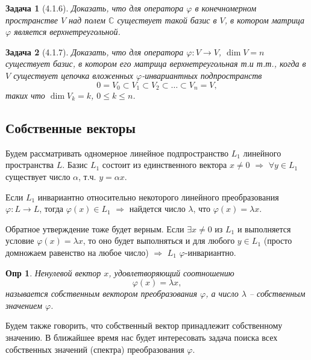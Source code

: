 \documentclass[a4paper,12pt]{article}
\newtheorem*{definition}{Опр}
\newtheorem*{prob}{Задача}
\begin{document}
\begin{prob}[4.1.6]
	Доказать, что для оператора $\varphi$ в конечномерном пространстве $V$ над полем $\mathbb{C}$ существует такой базис в $V$, в котором матрица $\varphi$ является верхнетреугольной.
\end{prob}

\begin{prob}[4.1.7]
	Доказать, что для оператора $\varphi: V \to V$, $\dim V = n$ существует базис, в котором его матрица верхнетреугольная т.и т.т., когда в $V$ существует цепочка вложенных $\varphi$-инвариантных подпространств
	\[
		0 = V_0 \subset V_1 \subset V_2 \subset \ldots \subset V_n = V,
	\]
	таких что $\dim V_k = k$, $0 \le k \le n$.
\end{prob}

\subsection{Собственные векторы}

Будем рассматривать одномерное линейное подпространство $L_1$ линейного пространства $L$. Базис $L_1$ состоит из единственного вектора $x \ne 0$ $\Rightarrow$ $\forall y \in L_1$ существует число $\alpha$, т.ч. $y = \alpha x$.

Если $L_1$ инвариантно относительно некоторого линейного преобразования $\varphi: L \to L$, тогда $\varphi(x) \in L_1$ $\Rightarrow$ найдется число $\lambda$, что $\varphi(x) = \lambda x$.
	
Обратное утверждение тоже будет верным. Если $\exists x \ne 0$ из $L_1$ и выполняется условие $\varphi(x) = \lambda x$, то оно будет выполняться и для любого $y \in L_1$ (просто домножаем равенство на любое число) $\Rightarrow$ $L_1$ $\varphi$-инвариантно.

\begin{definition}
	Ненулевой вектор $x$, удовлетворяющий соотношению 
	\begin{equation}
		\varphi(x) = \lambda x, 
	\end{equation}
	называется собственным вектором преобразования $\varphi$, а число $\lambda$ -- собственным значением $\varphi$. 
\end{definition}

Будем также говорить, что собственный вектор принадлежит собственному значению. В ближайшее время нас будет интересовать задача поиска всех собственных значений (спектра) преобразования $\varphi$. 
\end{document}
